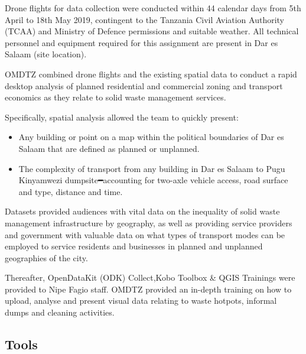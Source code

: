 \documentclass[a4paper,12pt,twoside]{article}
\begin{document}
    Drone flights for data collection were conducted within 44 calendar days from 5th April to 18th May 2019, contingent  to the Tanzania Civil Aviation Authority (TCAA) and Ministry of Defence permissions and suitable weather. All technical personnel and equipment required for this assignment are present in Dar es Salaam (site location).
    
    OMDTZ  combined drone flights and the existing spatial data to conduct a rapid desktop analysis of planned residential and commercial zoning and transport economics as they relate to solid waste management services. 

    Specifically, spatial analysis allowed the team to quickly present:
    \begin{itemize}
    \item Any building or point on a map within the political boundaries of Dar es Salaam that are defined as planned or unplanned.   
    \item The complexity of transport from any building in Dar es Salaam to Pugu Kinyamwezi dumpsite━accounting for two-axle vehicle access, road surface and type, distance and time. 
    \end{itemize} 

    Datasets provided audiences with vital data on the inequality of solid waste management infrastructure by geography, as well as providing service providers and government with valuable data on what types of transport modes can be employed to service residents and businesses in planned and unplanned geographies of the city.

    Thereafter, OpenDataKit (ODK) Collect,Kobo Toolbox & QGIS Trainings were provided to Nipe Fagio staff. OMDTZ provided an in-depth training on how to upload, analyse and present visual data relating to waste hotpots, informal dumps and cleaning activities.

\subsection{Tools}
\end{document}
